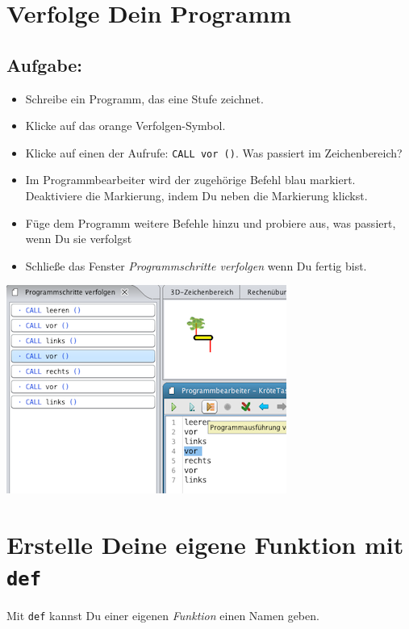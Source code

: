 \chapter{Verfolge Dein Programm}
\begin{multicols}{2}
\section*{\color{BrickRed}Aufgabe:}


\begin{itemize}

\item {Schreibe ein Programm, das eine Stufe zeichnet.}
\item {Klicke auf das orange Verfolgen-Symbol.}
\item {Klicke auf einen der Aufrufe: \lstinline{CALL vor ()}. Was passiert im Zeichenbereich?}
\item {Im Programmbearbeiter wird der zugehörige Befehl blau markiert. Deaktiviere die Markierung, indem Du neben die Markierung klickst.}
\item {Füge dem Programm weitere Befehle hinzu und probiere aus, was passiert, wenn Du sie verfolgst}
\item {Schließe das Fenster {\it Programmschritte verfolgen} wenn Du fertig bist.}

\end{itemize}



\columnbreak

\begin{center}
\includegraphics{../img/trace_de.png}
\end{center}

\end{multicols}

\chapter{Erstelle Deine eigene Funktion mit \lstinline{def}}Mit \lstinline{def} kannst Du einer eigenen {\it Funktion} einen Namen geben.

